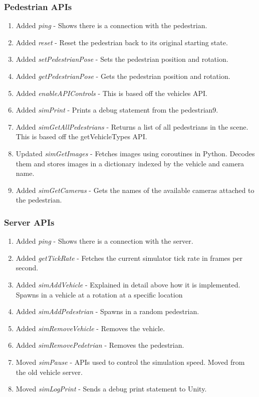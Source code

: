 \subsubsection{Pedestrian APIs}
\begin{enumerate}
    \item Added \emph{ping} - Shows there is a connection with the pedestrian.
    \item Added \emph{reset} - Reset the pedestrian back to its original starting state.
    \item Added \emph{setPedestrianPose} - Sets the pedestrian position and rotation.
    \item Added \emph{getPedestrianPose} - Gets the pedestrian position and rotation.
    \item Added \emph{enableAPIControls} - This is based off the vehicles API. 
    \item Added \emph{simPrint} - Prints a debug statement from the pedestrian9.
    \item Added \emph{simGetAllPedestrians} - Returns a list of all pedestrians in the scene. This is based off the getVehicleTypes API. 
    \item Updated \emph{simGetImages} - Fetches images using coroutines in Python. Decodes them and stores images in a dictionary indexed by the vehicle and camera name.
    \item Added \emph{simGetCameras} - Gets the names of the available cameras attached to the pedestrian. 
\end{enumerate}


\subsubsection{Server APIs}
\begin{enumerate}
    \item Added \emph{ping} - Shows there is a connection with the server.
    \item Added \emph{getTickRate} - Fetches the current simulator tick rate in frames per second.
    \item Added \emph{simAddVehicle} - Explained in detail above how it is implemented. Spawns in a vehicle at a rotation at a specific location
    \item Added \emph{simAddPedestrian} - Spawns in a random pedestrian.
    \item Added \emph{simRemoveVehicle} - Removes the vehicle.    
    \item Added \emph{simRemovePedetrian} - Removes the pedestrian.
    \item Moved \emph{simPause} - APIs used to control the simulation speed. Moved from the old vehicle server.
    \item Moved \emph{simLogPrint} - Sends a debug print statement to Unity. 
\end{enumerate}



